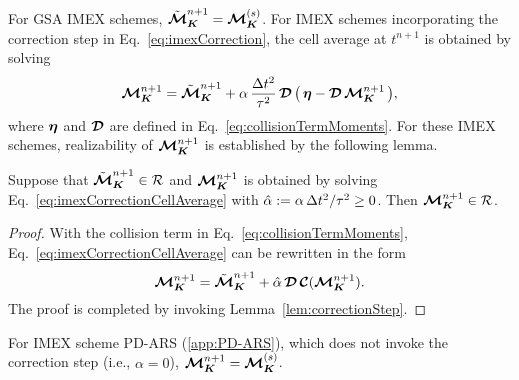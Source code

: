 For GSA IMEX schemes, $\tilde{\boldsymbol{\mathcal{M}}}_{\boldsymbol{K}}^{n+1}=\boldsymbol{\mathcal{M}}_{\boldsymbol{K}}^{(s)}$.  
For IMEX schemes incorporating the correction step in Eq.~\eqref{eq:imexCorrection}, the cell average at $t^{n+1}$ is obtained by solving
\begin{equation}
  \boldsymbol{\mathcal{M}}_{\boldsymbol{K}}^{n+1}=\tilde{\boldsymbol{\mathcal{M}}}_{\boldsymbol{K}}^{n+1}+\alpha\,\frac{\Delta t^{2}}{\tau^{2}}\,\boldsymbol{\mathcal{D}}\,\big(\,\boldsymbol{\eta}-\boldsymbol{\mathcal{D}}\,\boldsymbol{\mathcal{M}}_{\boldsymbol{K}}^{n+1}\,\big),
  \label{eq:imexCorrectionCellAverage}
\end{equation}
where $\boldsymbol{\eta}$ and $\boldsymbol{\mathcal{D}}$ are defined in Eq.~\eqref{eq:collisionTermMoments}.  
For these IMEX schemes, realizability of $\boldsymbol{\mathcal{M}}_{\boldsymbol{K}}^{n+1}$ is established by the following lemma.  
\begin{lemma}
  Suppose that $\tilde{\boldsymbol{\mathcal{M}}}_{\boldsymbol{K}}^{n+1}\in\mathcal{R}$ and $\boldsymbol{\mathcal{M}}_{\boldsymbol{K}}^{n+1}$ is obtained by solving Eq.~\eqref{eq:imexCorrectionCellAverage} with $\hat{\alpha}:=\alpha\,\Delta t^{2}/\tau^{2}\ge0$.  
  Then $\boldsymbol{\mathcal{M}}_{\boldsymbol{K}}^{n+1}\in\mathcal{R}$.  
  \label{lem:imexCorrectionCellAverage}
\end{lemma}
\begin{proof}
  With the collision term in Eq.~\eqref{eq:collisionTermMoments}, Eq.~\eqref{eq:imexCorrectionCellAverage} can be rewritten in the form
  \begin{equation*}
    \boldsymbol{\mathcal{M}}_{\boldsymbol{K}}^{n+1}=\tilde{\boldsymbol{\mathcal{M}}}_{\boldsymbol{K}}^{n+1}+\hat{\alpha}\,\boldsymbol{\mathcal{D}}\,\boldsymbol{\mathcal{C}}(\boldsymbol{\mathcal{M}}_{\boldsymbol{K}}^{n+1}).  
  \end{equation*}
  The proof is completed by invoking Lemma~\ref{lem:correctionStep}.  
\end{proof}

\begin{rem}
  For IMEX scheme PD-ARS (\ref{app:PD-ARS}), which does not invoke the correction step (i.e., $\alpha=0$), $\boldsymbol{\mathcal{M}}_{\boldsymbol{K}}^{n+1}=\boldsymbol{\mathcal{M}}_{\boldsymbol{K}}^{(s)}$.  
\end{rem}


